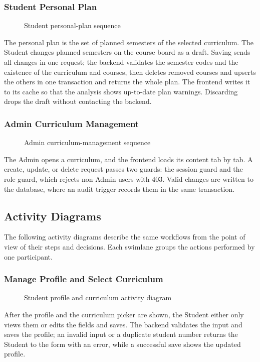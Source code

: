\subsubsection{Student Personal Plan}
\begin{figure}[H]
    \centering
    
    \caption{Student personal-plan sequence}
\end{figure}
The personal plan is the set of planned semesters of the selected curriculum. The Student changes planned semesters on the course board as a draft. Saving sends all changes in one request; the backend validates the semester codes and the existence of the curriculum and courses, then deletes removed courses and upserts the others in one transaction and returns the whole plan. The frontend writes it to its cache so that the analysis shows up-to-date plan warnings. Discarding drops the draft without contacting the backend.

\subsubsection{Admin Curriculum Management}
\begin{figure}[H]
    \centering
    
    \caption{Admin curriculum-management sequence}
\end{figure}
The Admin opens a curriculum, and the frontend loads its content tab by tab. A create, update, or delete request passes two guards: the session guard and the role guard, which rejects non-Admin users with 403. Valid changes are written to the database, where an audit trigger records them in the same transaction.

\subsection{Activity Diagrams}

The following activity diagrams describe the same workflows from the point of view of their steps and decisions. Each swimlane groups the actions performed by one participant.

\subsubsection{Manage Profile and Select Curriculum}
\begin{figure}[H]
    \centering
    
    \caption{Student profile and curriculum activity diagram}
\end{figure}
After the profile and the curriculum picker are shown, the Student either only views them or edits the fields and saves. The backend validates the input and saves the profile; an invalid input or a duplicate student number returns the Student to the form with an error, while a successful save shows the updated profile.

